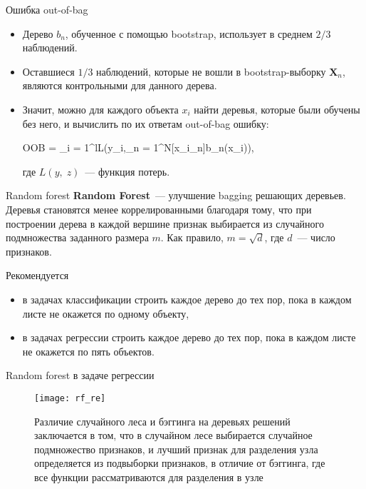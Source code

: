 \documentclass[notheorems, handout]{beamer}
\begin{document}
\begin{frame}{Ошибка out-of-bag}
\begin{itemize}
	\item Дерево $b_{n}$, обученное с помощью bootstrap, использует в среднем $2/3$ наблюдений.
	\item Оставшиеся $1/3$ наблюдений, которые не вошли в bootstrap-выборку $\mathbf{X}_{n}$, являются контрольными для данного дерева.
	\item Значит, можно для каждого объекта $x_{i}$ найти деревья, которые были обучены без него, и вычислить по их ответам out-of-bag ошибку:
		\begin{flalign*}
			OOB = \displaystyle\sum_{i = 1}^{l}L\left(y_{i},\;\displaystyle\sum_{n = 1}^{N}[x_{i}\notin{}_{n}]b_{n}(x_{i})\right),
		\end{flalign*}
где $L(y,\; z)$~--- функция потерь.
\end{itemize}
\end{frame}

\begin{frame}{Random forest}
\textbf{Random Forest}~--- улучшение bagging решающих деревьев. Деревья становятся менее коррелированными благодаря тому, что при построении дерева в каждой вершине признак выбирается из случайного подмножества заданного размера $m$. Как правило, $m = \sqrt{d}$, где $d$~--- число признаков.
\par\smallskip
Рекомендуется
\begin{itemize}
	\item в задачах классификации строить каждое дерево до тех пор, пока в каждом листе не окажется по одному объекту,
	\item в задачах регрессии строить каждое дерево до тех пор, пока в каждом листе не окажется по пять объектов.
\end{itemize}
\end{frame}

\begin{frame}{Random forest в задаче регрессии}
\begin{figure}[h!]
  \texttt{[image: rf\_re]}
 \caption{Различие случайного леса и бэггинга на деревьях решений заключается в том, что в случайном лесе выбирается случайное подмножество признаков, и лучший признак для разделения узла определяется из подвыборки признаков, в отличие от бэггинга, где все функции рассматриваются для разделения в узле}
\end{figure}
\end{frame}
\end{document}
